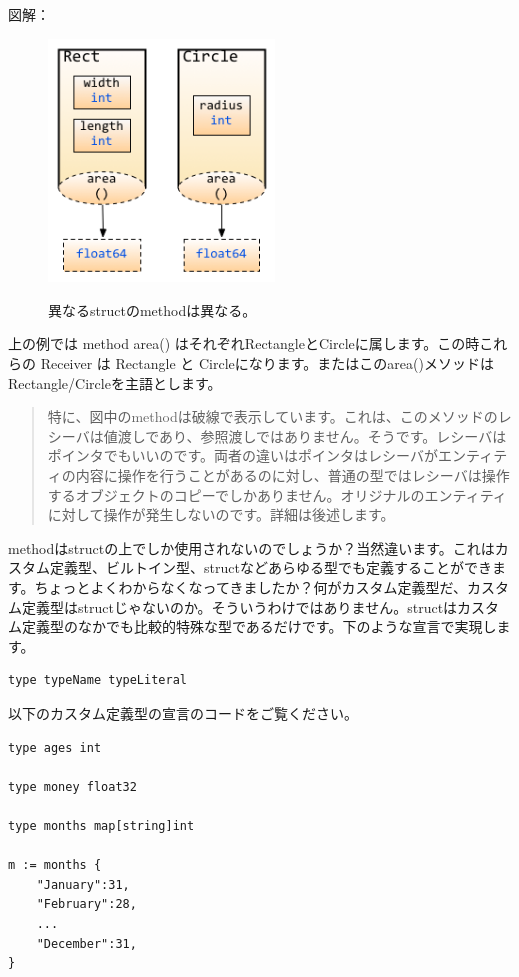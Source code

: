 図解：

\begin{figure}[H]
  \includegraphics[width=6cm]{2.5.shapes_func_with_receiver_cp.png}
   \label{図2.9}
   \caption{異なるstructのmethodは異なる。}
\end{figure}

上の例では method area() はそれぞれRectangleとCircleに属します。この時これらの Receiver は Rectangle と Circleになります。またはこのarea()メソッドはRectangle/Circleを主語とします。

\begin{quote}
特に、図中のmethodは破線で表示しています。これは、このメソッドのレシーバは値渡しであり、参照渡しではありません。そうです。レシーバはポインタでもいいのです。両者の違いはポインタはレシーバがエンティティの内容に操作を行うことがあるのに対し、普通の型ではレシーバは操作するオブジェクトのコピーでしかありません。オリジナルのエンティティに対して操作が発生しないのです。詳細は後述します。
\end{quote}

methodはstructの上でしか使用されないのでしょうか？当然違います。これはカスタム定義型、ビルトイン型、structなどあらゆる型でも定義することができます。ちょっとよくわからなくなってきましたか？何がカスタム定義型だ、カスタム定義型はstructじゃないのか。そういうわけではありません。structはカスタム定義型のなかでも比較的特殊な型であるだけです。下のような宣言で実現します。

\begin{lstlisting}[numbers=none]
type typeName typeLiteral
\end{lstlisting}

以下のカスタム定義型の宣言のコードをご覧ください。

\begin{lstlisting}[numbers=none]
type ages int

type money float32

type months map[string]int

m := months {
    "January":31,
    "February":28,
    ...
    "December":31,
}
\end{lstlisting}

